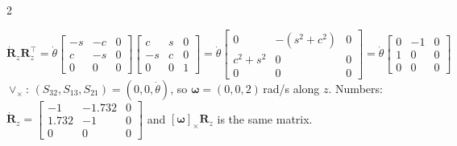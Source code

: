 \begin{multicols}{2}
\begin{worked}[$\mathbf R_z(\theta)$, $\theta=30^\circ$, $\dot\theta=2$\,rad/s]
\[\dot{\mathbf R}_z\mathbf R_z^\top=\dot\theta\begin{bmatrix}-s&-c&0\\c&-s&0\\0&0&0\end{bmatrix}\begin{bmatrix}c&s&0\\-s&c&0\\0&0&1\end{bmatrix}=\dot\theta\begin{bmatrix}0&-(s^2+c^2)&0\\c^2+s^2&0&0\\0&0&0\end{bmatrix}=\dot\theta\begin{bmatrix}0&-1&0\\1&0&0\\0&0&0\end{bmatrix}\]
$\vee_\times$: $(S_{32},S_{13},S_{21})=(0,0,\dot\theta)$, so $\boldsymbol\omega=(0,0,2)$\,rad/s along $z$. Numbers: $\dot{\mathbf R}_z=\begin{bmatrix}-1&-1.732&0\\1.732&-1&0\\0&0&0\end{bmatrix}$ and $[\boldsymbol\omega]_\times\mathbf R_z$ is the same matrix. \chk
\end{worked}


\end{multicols}
